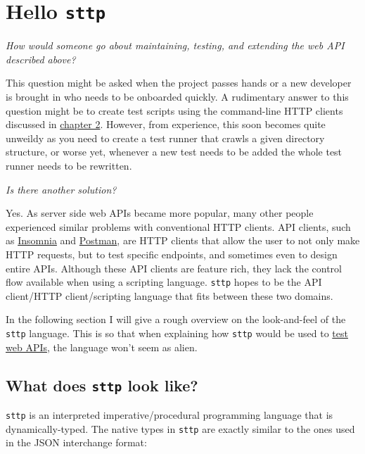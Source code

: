 \cprotect\chapter{Hello \verb|sttp|}

\begin{center}
    \textit{How would someone go about maintaining, testing, and extending the web API described above?}
\end{center}

This question might be asked when the project passes hands or a new developer is brought in who needs to be onboarded quickly. A rudimentary answer to this question might be to create test scripts using the command-line HTTP clients discussed in \hyperref[sec:meet-sttp-http-clients]{chapter 2}. However, from experience, this soon becomes quite unweildy as you need to create a test runner that crawls a given directory structure, or worse yet, whenever a new test needs to be added the whole test runner needs to be rewritten.

\begin{center}
    \textit{Is there another solution?}
\end{center}

Yes. As server side web APIs became more popular, many other people experienced similar problems with conventional HTTP clients. API clients, such as \href{https://insomnia.rest/}{Insomnia} and \href{https://www.postman.com/}{Postman}, are HTTP clients that allow the user to not only make HTTP requests, but to test specific endpoints, and sometimes even to design entire APIs. Although these API clients are feature rich, they lack the control flow available when using a scripting language. \verb|sttp| hopes to be the API client/HTTP client/scripting language that fits between these two domains.

In the following section I will give a rough overview on the look-and-feel of the \verb|sttp| language. This is so that when explaining how \verb|sttp| would be used to \hyperref[sec:hello-sttp-using-sttp-to-test]{test web APIs}, the language won't seem as alien.

\cprotect\section{What does \verb|sttp| look like?}

\verb|sttp| is an interpreted imperative/procedural programming language that is dynamically-typed. The native types in \verb|sttp| are exactly similar to the ones used in the JSON interchange format:

